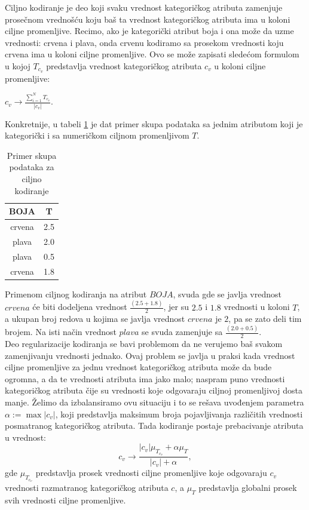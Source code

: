 \documentclass[12pt,oneside]{memoir}
\begin{document}
Ciljno kodiranje je deo koji svaku vrednost kategoričkog atributa zamenjuje prosečnom vrednošću koju baš ta vrednost kategoričkog atributa ima u koloni ciljne promenljive. Recimo, ako je kategorički atribut boja i ona može da uzme vrednosti: crvena i plava, onda crvenu kodiramo sa prosekom vrednosti koju crvena ima u koloni ciljne promenljive. Ovo se može zapisati sledećom formulom u kojoj $T_{c_v}$ predstavlja vrednost kategoričkog atributa $c_v$ u koloni ciljne promenljive: 

\begin{center}
$c_v \to \frac{\sum\limits_{i=1}^{N}{T_{c_v}}}{|c_v|}.$ 
\end{center}
Konkretnije, u tabeli \ref{tbl: kodiranje_uticajem} je dat primer skupa podataka sa jednim atributom koji je kategorički i sa numeričkom ciljnom promenljivom $T$. 
\begin{table}
\centering
\caption{Primer skupa podataka za ciljno kodiranje}
\label{tbl: kodiranje_uticajem}
\begin{tabular}{ |c|c|} 
\hline
BOJA & T \\
\hline
crvena & 2.5 \\
plava & 2.0 \\
plava & 0.5 \\
crvena & 1.8 \\
\hline
\end{tabular}
\end{table}
Primenom ciljnog kodiranja na atribut $BOJA$, svuda gde se javlja vrednost $crvena$ će biti dodeljena vrednost $\frac{(2.5 + 1.8)}{2}$, jer su $2.5$ i $1.8$ vrednosti u koloni $T$, a ukupan broj redova u kojima se javlja vrednost $crvena$ je $2$, pa se zato deli tim brojem. Na isti način vrednost $plava$ se svuda zamenjuje sa $\frac{(2.0 + 0.5)}{2}$.\\
Deo regularizacije kodiranja se bavi problemom da ne verujemo baš svakom zamenjivanju vrednosti jednako. Ovaj problem se javlja u praksi kada vrednost ciljne promenljive za jednu vrednost kategoričkog atributa može da bude ogromna, a da te vrednosti atributa ima jako malo; naspram puno vrednosti kategoričkog atributa čije su vrednosti koje odgovaraju ciljnoj promenljivoj dosta manje. Želimo da izbalansiramo ovu situaciju i to se rešava uvođenjem parametra $\alpha := \max |c_v|$, koji predstavlja maksimum broja pojavljivanja različitih vrednosti posmatranog kategoričkog atributa. Tada kodiranje postaje prebacivanje atributa u vrednost: 
$$c_v \to \frac{|c_v|\mu_{T_{c_v}} + \alpha\mu_{T}}{|c_v| + \alpha},$$
gde $\mu_{T_{c_v}}$ predstavlja prosek vrednosti ciljne promenljive koje odgovaraju $c_v$ vrednosti razmatranog kategoričkog atributa $c$, a $\mu_T$ predstavlja globalni prosek svih vrednosti ciljne promenljive.\\
\end{document}
